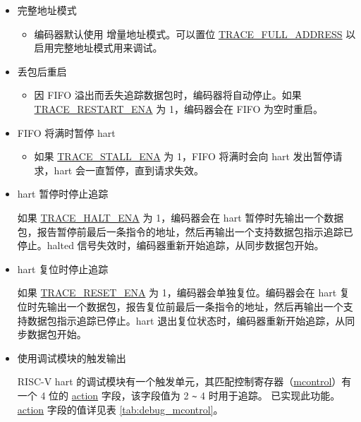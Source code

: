 \documentclass[main\_\_CN.tex]{subfiles}
\begin{document}
\begin{itemize}
    \item 完整地址模式
        \begin{itemize}
            \item 编码器默认使用 增量地址模式。可以置位 \hyperref[fielddesc:TRACEFULLADDRESS]{TRACE\_FULL\_ADDRESS} 以启用完整地址模式用来调试。
        \end{itemize}

        \item 丢包后重启
            \begin{itemize}
                \item 因 FIFO 溢出而丢失追踪数据包时，编码器将自动停止。如果 \hyperref[fielddesc:TRACERESTARTENA]{TRACE\_RESTART\_ENA} 为 1，编码器会在 FIFO 为空时重启。
            \end{itemize}

        \item FIFO 将满时暂停 hart
            \begin{itemize}
                \item 如果 \hyperref[fielddesc:TRACESTALLENA]{TRACE\_STALL\_ENA} 为 1，FIFO 将满时会向 hart 发出暂停请求，hart 会一直暂停，直到请求失效。
            \end{itemize}

        \item hart 暂停时停止追踪

            如果 \hyperref[fielddesc:TRACEHALTENA]{TRACE\_HALT\_ENA} 为 1，编码器会在 hart 暂停时先输出一个数据包，报告暂停前最后一条指令的地址，然后再输出一个支持数据包指示追踪已停止。halted 信号失效时，编码器重新开始追踪，从同步数据包开始。

        \item hart 复位时停止追踪

            如果 \hyperref[fielddesc:TRACERESETENA]{TRACE\_RESET\_ENA} 为 1，编码器会单独复位。编码器会在 hart 复位时先输出一个数据包，报告复位前最后一条指令的地址，然后再输出一个支持数据包指示追踪已停止。hart 退出复位状态时，编码器重新开始追踪，从同步数据包开始。

        \item 使用调试模块的触发输出

            RISC-V hart 的调试模块有一个触发单元，其匹配控制寄存器（\hyperref[regdesc:MCONTROL]{mcontrol}）有一个 4 位的 \hyperref[fielddesc:MCONTROLACTION]{action} 字段，该字段值为 2 \verb+~+ 4 时用于追踪。\chipname{} 已实现此功能。\hyperref[fielddesc:MCONTROLACTION]{action} 字段的值详见表 \ref{tab:debug_mcontrol}。


\end{itemize}
\end{document}
